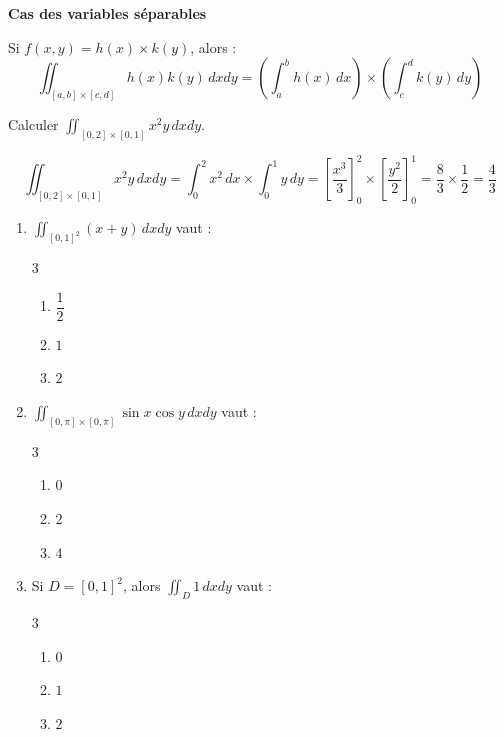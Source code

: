 \documentclass[../PolyS2.tex]{subfiles}
\begin{document}
\begin{Prop}\textbf{Cas des variables séparables}

Si $f(x,y) = h(x) \times k(y)$, alors :
$$\iint_{[a,b] \times [c,d]} h(x) k(y) \, dxdy = \left(\int_a^b h(x) \, dx\right) \times \left(\int_c^d k(y) \, dy\right)$$
\end{Prop}

\begin{Ex}
Calculer $\displaystyle\iint_{[0,2] \times [0,1]} x^2 y \, dxdy$.

$$\iint_{[0,2] \times [0,1]} x^2 y \, dxdy = \int_0^2 x^2 \, dx \times \int_0^1 y \, dy = \left[\frac{x^3}{3}\right]_0^2 \times \left[\frac{y^2}{2}\right]_0^1 = \frac{8}{3} \times \frac{1}{2} = \frac{4}{3}$$
\end{Ex}

\newpage 


\begin{enumerate}
\item $\displaystyle\iint_{[0,1]^2} (x+y) \, dxdy$ vaut :
\begin{multicols}{3}
\begin{enumerate}[label=\alph*.]
\item $\dfrac{1}{2}$
\item $1$
\item $2$
\end{enumerate}
\end{multicols}

\item $\displaystyle\iint_{[0,\pi] \times [0,\pi]} \sin x \cos y \, dxdy$ vaut :
\begin{multicols}{3}
\begin{enumerate}[label=\alph*.]
\item $0$
\item $2$
\item $4$
\end{enumerate}
\end{multicols}

\item Si $D = [0,1]^2$, alors $\displaystyle\iint_D 1 \, dxdy$ vaut :
\begin{multicols}{3}
\begin{enumerate}[label=\alph*.]
\item $0$
\item $1$
\item $2$
\end{enumerate}
\end{multicols}
\end{enumerate}
\end{document}
